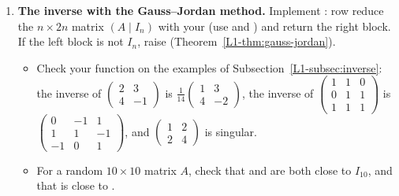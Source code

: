 \begin{enumerate}[label=\textbf{P\arabic*.}, leftmargin=*]
    \item \textbf{The inverse with the Gauss--Jordan method.} Implement : row reduce the $n \times 2n$ matrix $(A \mid I_n)$ with your  (use  and ) and return the right block. If the left block is not $I_n$, raise  (Theorem~\ref{L1-thm:gauss-jordan}).
    \begin{itemize}
        \item Check your function on the examples of Subsection~\ref{L1-subsec:inverse}: the inverse of $\begin{pmatrix} 2 & 3 \\ 4 & -1 \end{pmatrix}$ is $\frac{1}{14} \begin{pmatrix} 1 & 3 \\ 4 & -2 \end{pmatrix}$, the inverse of $\begin{pmatrix} 1 & 1 & 0 \\ 0 & 1 & 1 \\ 1 & 1 & 1 \end{pmatrix}$ is $\begin{pmatrix} 0 & -1 & 1 \\ 1 & 1 & -1 \\ -1 & 0 & 1 \end{pmatrix}$, and $\begin{pmatrix} 1 & 2 \\ 2 & 4 \end{pmatrix}$ is singular.
        \item For a random $10 \times 10$ matrix $A$, check that  and  are both close to $I_{10}$, and that  is close to .
    \end{itemize}


\end{enumerate}
